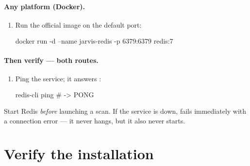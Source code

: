 \paragraph{Any platform (Docker).}
\begin{enumerate}
  \item Run the official image on the default port:
\begin{terminal}
\begin{jcmd}
docker run -d --name jarvis-redis -p 6379:6379 redis:7
\end{jcmd}
\end{terminal}
\end{enumerate}

\paragraph{Then verify --- both routes.}
\begin{enumerate}
  \item Ping the service; it answers :
\begin{terminal}
\begin{jcmd}
redis-cli ping        # -> PONG
\end{jcmd}
\end{terminal}
\end{enumerate}

\begin{jwarn}
Start Redis \emph{before} launching a scan. If the service is down, 
fails immediately with a connection error --- it never hangs, but it also never starts.
\end{jwarn}

\section{Verify the installation}
\label{sec:verify}


